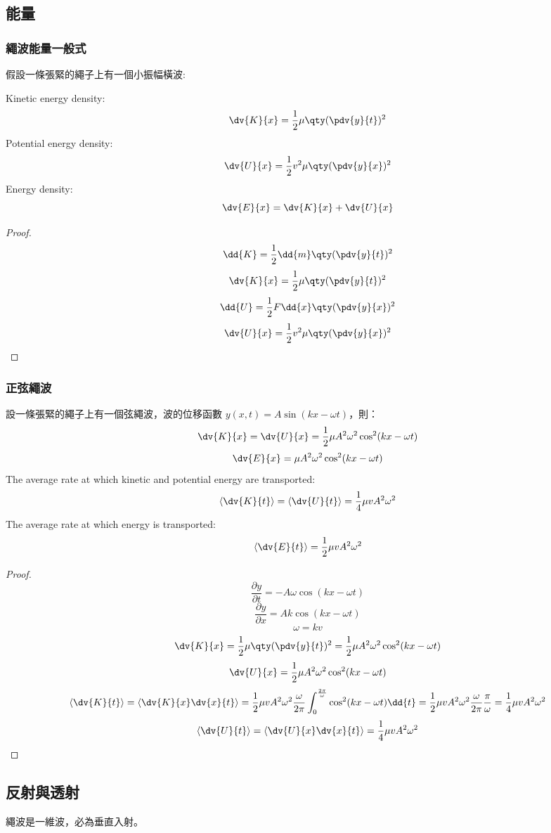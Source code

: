 \documentclass[a4paper,12pt]{report}
\begin{document}
\subsection{能量}
\subsubsection{繩波能量一般式}
假設一條張緊的繩子上有一個小振幅橫波:

Kinetic energy density:
\[\dv{K}{x}=\frac{1}{2}\mu\qty(\pdv{y}{t})^2\]
Potential energy density:
\[\dv{U}{x}=\frac{1}{2}v^2\mu\qty(\pdv{y}{x})^2\]
Energy density:
\[\dv{E}{x}=\dv{K}{x}+\dv{U}{x}\]
\begin{proof}
    \[\dd{K}=\frac{1}{2}\dd{m}\qty(\pdv{y}{t})^2\]
    \[\dv{K}{x}=\frac{1}{2}\mu\qty(\pdv{y}{t})^2\]
    \[\dd{U}=\frac{1}{2}F\dd{x}\qty(\pdv{y}{x})^2\]
    \[\dv{U}{x}=\frac{1}{2}v^2\mu\qty(\pdv{y}{x})^2\]
\end{proof}
\subsubsection{正弦繩波}
設一條張緊的繩子上有一個弦繩波，波的位移函數 \( y(x,t) = A \sin(kx - \omega t) \)，則：
\[ \dv{K}{x} = \dv{U}{x} = \frac{1}{2}\mu A^2 \omega^2 \cos^2(kx - \omega t) \]
\[ \dv{E}{x} = \mu A^2 \omega^2 \cos^2(kx - \omega t) \]
The average rate at which kinetic and potential energy are transported:
\[\left\langle\dv{K}{t}\right\rangle=\left\langle\dv{U}{t}\right\rangle=\frac{1}{4}\mu vA^2\omega^2\]
The average rate at which energy is transported:
\[\left\langle\dv{E}{t}\right\rangle=\frac{1}{2}\mu vA^2\omega^2\]
\begin{proof}
\[ \frac{\partial y}{\partial t} = -A \omega \cos(kx - \omega t) \]
\[ \frac{\partial y}{\partial x} = A k \cos(kx - \omega t) \]
\[ \omega = k v \]
\[\dv{K}{x}=\frac{1}{2}\mu\qty(\pdv{y}{t})^2=\frac{1}{2}\mu A^2\omega^2\cos^2(kx - \omega t)\]
\[\dv{U}{x}=\frac{1}{2}\mu A^2\omega^2\cos^2(kx - \omega t)\]
\[\left\langle\dv{K}{t}\right\rangle=\left\langle\dv{K}{x}\dv{x}{t}\right\rangle=\frac{1}{2}\mu vA^2\omega^2\frac{\omega}{2\pi}\int_0^{\frac{2\pi}{\omega}}\cos^2(kx-\omega t)\dd{t}=\frac{1}{2}\mu vA^2\omega^2\frac{\omega}{2\pi}\frac{\pi}{\omega}=\frac{1}{4}\mu vA^2\omega^2\]
\[\left\langle\dv{U}{t}\right\rangle=\left\langle\dv{U}{x}\dv{x}{t}\right\rangle=\frac{1}{4}\mu vA^2\omega^2\]
\end{proof}
\subsection{反射與透射}
繩波是一維波，必為垂直入射。
\end{document}
